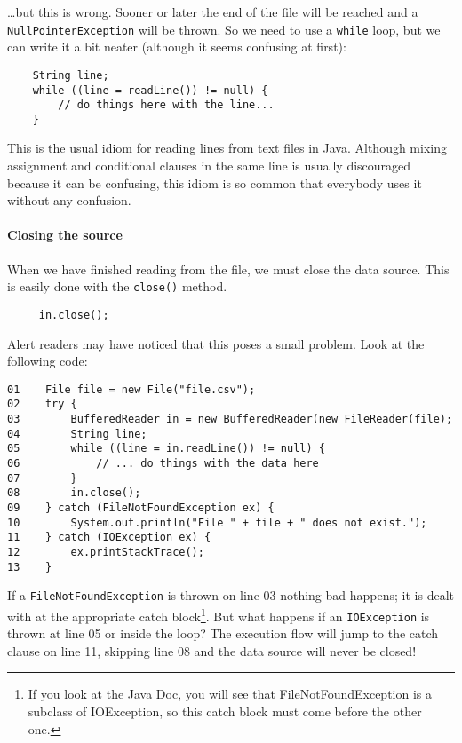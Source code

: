 \ldots but this is wrong. Sooner or later the end of the file will be
reached and a \verb+NullPointerException+ will be thrown. So we need
to use a \verb+while+ loop, but we can write it a bit neater (although
it seems confusing at first): 

\begin{verbatim}
    String line;
    while ((line = readLine()) != null) {
        // do things here with the line...
    }
\end{verbatim}

This is the usual idiom for reading lines from text files in
Java. Although mixing assignment and conditional clauses in the same
line is usually discouraged because it can be confusing, this idiom is
so common that everybody uses it without any confusion. 

\paragraph{Closing the source}
\label{sec:closing-source}

When we have finished reading from the file, we must close the
data source. This is easily done with the \verb+close()+ method. 

\begin{verbatim}
     in.close();
\end{verbatim}

Alert readers may have noticed that this poses a small problem. Look
at the following code: 

\begin{verbatim}
01    File file = new File("file.csv");
02    try {
03        BufferedReader in = new BufferedReader(new FileReader(file); 
04        String line;
05        while ((line = in.readLine()) != null) {
06            // ... do things with the data here
07        }
08        in.close();
09    } catch (FileNotFoundException ex) {
10        System.out.println("File " + file + " does not exist.");
11    } catch (IOException ex) {
12        ex.printStackTrace();
13    }    
\end{verbatim}

If a \verb+FileNotFoundException+ is thrown on 
line 03 nothing bad
happens; it is dealt with at the appropriate catch block\footnote{If
  you look at the Java Doc, you will see that FileNotFoundException is
  a subclass of IOException, so this catch block must come before the
  other one.}. But what
happens if an \verb+IOException+ is thrown at 
line 05 or inside the loop? 
The execution flow will jump to the catch clause on 
line 11, skipping 
line 08 
and the data source will never be closed! 

